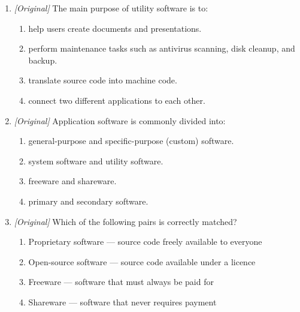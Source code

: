 \documentclass[11pt]{article}
\begin{document}
\begin{enumerate}[label=\textbf{Q\arabic*.}, leftmargin=*]
\begin{enumerate}[label=\Alph*.]
    \item General Public License
    \item GNU General Public License
    \item General Purpose Language
    \item Global Program Loader
  \end{enumerate}
\item \textit{[Original]} The main purpose of utility software is to:
  \begin{enumerate}[label=\Alph*.]
    \item help users create documents and presentations.
    \item perform maintenance tasks such as antivirus scanning, disk
      cleanup, and backup.
    \item translate source code into machine code.
    \item connect two different applications to each other.
  \end{enumerate}
\item \textit{[Original]} Application software is commonly divided into:
  \begin{enumerate}[label=\Alph*.]
    \item general-purpose and specific-purpose (custom) software.
    \item system software and utility software.
    \item freeware and shareware.
    \item primary and secondary software.
  \end{enumerate}
\item \textit{[Original]} Which of the following pairs is correctly matched?
  \begin{enumerate}[label=\Alph*.]
    \item Proprietary software --- source code freely available to everyone
    \item Open-source software --- source code available under a licence
    \item Freeware --- software that must always be paid for
    \item Shareware --- software that never requires payment
  \end{enumerate}


\end{enumerate}
\end{document}
